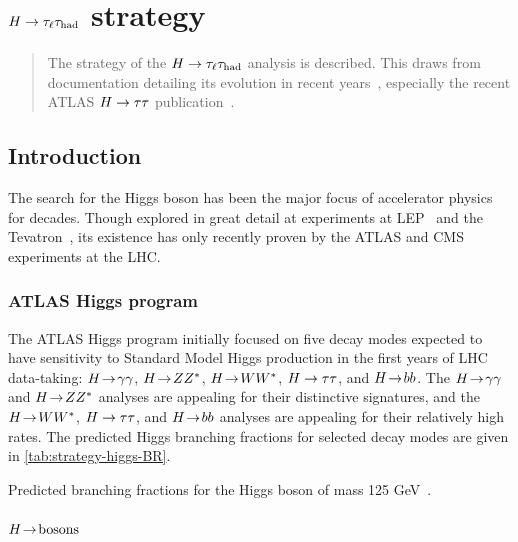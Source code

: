 \chapter[$\Htautaulh$ strategy][$\Htautaulh$ strategy]{$\Htautaulh$ strategy}
\label{chap:strategy}

\begin{quote}
  The strategy of the $\Htautaulh$ analysis is described. This draws from documentation detailing its evolution in recent years~\cite{ATLAS-CONF-2012-160,ATLAS-CONF-2013-108}, especially the recent ATLAS $H\rightarrow\tau\tau$ publication~\cite{HIGG-2013-32}.
\end{quote}

\section{Introduction}
\label{sec:strategy-introduction}

The search for the Higgs boson has been the major focus of accelerator physics for decades. Though explored in great detail at experiments at LEP~\cite{2003.lep-higgs} and the Tevatron~\cite{2013.tevatron-higgs}, its existence has only recently proven by the ATLAS and CMS experiments at the LHC.

\subsection{ATLAS Higgs program}
\label{sec:strategy-higgs}

The ATLAS Higgs program initially focused on five decay modes expected to have sensitivity to Standard Model Higgs production in the first years of LHC data-taking: $H \!\rightarrow\! \gamma\gamma$, $H \!\rightarrow\! ZZ^\ast$, $H \!\rightarrow\! WW^\ast$, $H\rightarrow\tau\tau$, and $H \!\rightarrow\! bb$. The $H \!\rightarrow\! \gamma\gamma$ and $H \!\rightarrow\! ZZ^\ast$ analyses are appealing for their distinctive signatures, and the $H \!\rightarrow\! WW^\ast$, $H\rightarrow\tau\tau$, and $H \!\rightarrow\! bb$ analyses are appealing for their relatively high rates. The predicted Higgs branching fractions for selected decay modes are given in \cref{tab:strategy-higgs-BR}.

\begin{table}[bp]
  \centering
  \renewcommand{\arraystretch}{1.4}
  \caption{Predicted branching fractions for the Higgs boson of mass 125 GeV~\cite{higgs-branchingfractions}.}
  
  \label{tab:strategy-higgs-BR}
\end{table}

\subsubsection{$H \!\rightarrow\! \text{bosons}$}

